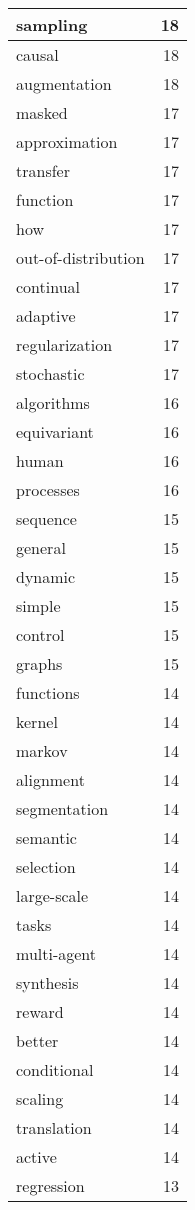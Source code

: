 \begin{table}[h]
\begin{tabular}{|l|r|}
\hline
sampling & 18 \\
\hline
causal & 18 \\
\hline
augmentation & 18 \\
\hline
masked & 17 \\
\hline
approximation & 17 \\
\hline
transfer & 17 \\
\hline
function & 17 \\
\hline
how & 17 \\
\hline
out-of-distribution & 17 \\
\hline
continual & 17 \\
\hline
adaptive & 17 \\
\hline
regularization & 17 \\
\hline
stochastic & 17 \\
\hline
algorithms & 16 \\
\hline
equivariant & 16 \\
\hline
human & 16 \\
\hline
processes & 16 \\
\hline
sequence & 15 \\
\hline
general & 15 \\
\hline
dynamic & 15 \\
\hline
simple & 15 \\
\hline
control & 15 \\
\hline
graphs & 15 \\
\hline
functions & 14 \\
\hline
kernel & 14 \\
\hline
markov & 14 \\
\hline
alignment & 14 \\
\hline
segmentation & 14 \\
\hline
semantic & 14 \\
\hline
selection & 14 \\
\hline
large-scale & 14 \\
\hline
tasks & 14 \\
\hline
multi-agent & 14 \\
\hline
synthesis & 14 \\
\hline
reward & 14 \\
\hline
better & 14 \\
\hline
conditional & 14 \\
\hline
scaling & 14 \\
\hline
translation & 14 \\
\hline
active & 14 \\
\hline
regression & 13 \\

\end{tabular}
\end{table}
